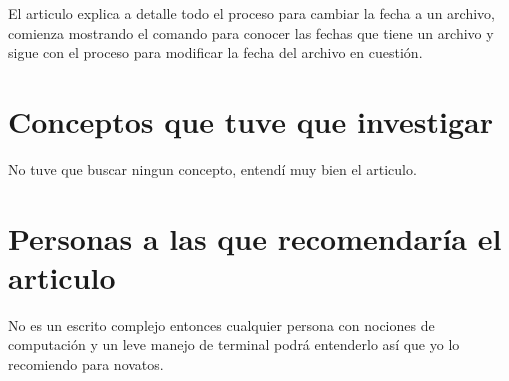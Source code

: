 \documentclass[11pt, a4paper]{report}
\begin{document}
El articulo explica a detalle todo el proceso para cambiar la fecha a un
archivo, comienza mostrando el comando para conocer las fechas que tiene un
archivo y sigue con el proceso para modificar la fecha del archivo en cuestión.

\section*{Conceptos que tuve que investigar}
No tuve que buscar ningun concepto, entendí muy bien el articulo.

\section*{Personas a las que recomendaría el articulo}
No es un escrito complejo entonces cualquier persona con nociones de computación
y un leve manejo de terminal podrá entenderlo así que yo lo recomiendo para
novatos.
\end{document}
